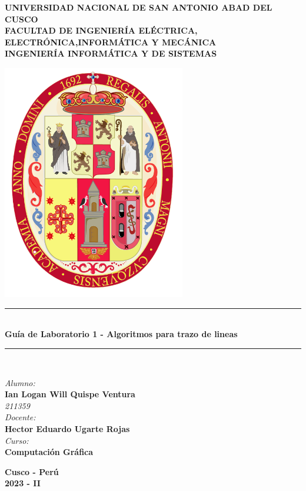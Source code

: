 \documentclass[a4paper]{article}
\begin{document}
\begin{titlepage}

\newcommand{\linea}{\rule{\linewidth}{0.7mm}} 
\center
\textbf{\Large UNIVERSIDAD NACIONAL DE SAN ANTONIO ABAD DEL CUSCO}\\[0.2cm]
\textbf{\Large FACULTAD DE INGENIERÍA ELÉCTRICA, ELECTRÓNICA,INFORMÁTICA Y MECÁNICA}\\[0.2cm]
\textbf{\Large INGENIERÍA INFORMÁTICA Y DE SISTEMAS\\[0.6cm]}

\includegraphics[width=8cm]{src/escudo-unsaac.png}
\vfill

\linea
\\[0.3cm]
\textbf{\LARGE Guía de Laboratorio 1 - Algoritmos para trazo de lineas}\\[0.2cm]
\linea \\
\vfill

\textit{\Large Alumno:}\\
    \textbf{\large Ian Logan Will Quispe Ventura}\\
    \textit{211359}\\

\vspace{0.3cm}
    \textit{\Large Docente:}\\
    \textbf{\large Hector Eduardo Ugarte Rojas}\\
\vspace{0.5cm}
    \textit{\Large Curso:}\\
    \textbf{\large Computación Gráfica}\\
    \vfill

\vspace{0.4cm}
    \textbf{\Large Cusco - Perú }\\
    \textbf{\large 2023 - II }\\
    \newpage
    \end{titlepage}
\end{document}
